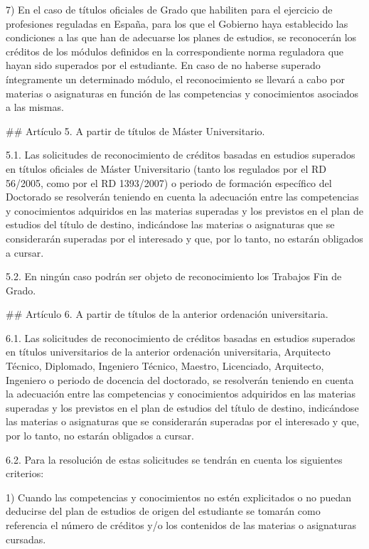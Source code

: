 \documentclass{article}
\begin{document}
\begin{itemize}
\begin{itemize}
\begin{scriptsize}
                  7) En el caso de títulos oficiales de Grado que habiliten para el ejercicio de profesiones reguladas en España, para los que el Gobierno haya establecido las condiciones a las que han de adecuarse los planes de estudios, se reconocerán los créditos de los módulos definidos en la correspondiente norma reguladora que hayan sido superados por el estudiante. En caso de no haberse superado íntegramente un determinado módulo, el reconocimiento se llevará a cabo por materias o asignaturas en función de las competencias y conocimientos asociados a las mismas.

                  \#\# Artículo 5. A partir de títulos de Máster Universitario.

                  5.1. Las solicitudes de reconocimiento de créditos basadas en estudios superados en títulos oficiales de Máster Universitario (tanto los regulados por el RD 56/2005, como por el RD 1393/2007) o periodo de formación específico del Doctorado se resolverán teniendo en cuenta la adecuación entre las competencias y conocimientos adquiridos en las materias superadas y los previstos en el plan de estudios del título de destino, indicándose las materias o asignaturas que se considerarán superadas por el interesado y que, por lo tanto, no estarán obligados a cursar.

                  5.2. En ningún caso podrán ser objeto de reconocimiento los Trabajos Fin de Grado.

                  \#\# Artículo 6. A partir de títulos de la anterior ordenación universitaria.

                  6.1. Las solicitudes de reconocimiento de créditos basadas en estudios superados en títulos universitarios de la anterior ordenación universitaria, Arquitecto Técnico, Diplomado, Ingeniero Técnico, Maestro, Licenciado, Arquitecto, Ingeniero o periodo de docencia del doctorado, se resolverán teniendo en cuenta la adecuación entre las competencias y conocimientos adquiridos en las materias superadas y los previstos en el plan de estudios del título de destino, indicándose las materias o asignaturas que se considerarán superadas por el interesado y que, por lo tanto, no estarán obligados a cursar.

                  6.2. Para la resolución de estas solicitudes se tendrán en cuenta los siguientes criterios:

                  1) Cuando las competencias y conocimientos no estén explicitados o no puedan deducirse del plan de estudios de origen del estudiante se tomarán como referencia el número de créditos y/o los contenidos de las materias o asignaturas cursadas.


\end{scriptsize}
\end{itemize}
\end{itemize}
\end{document}
